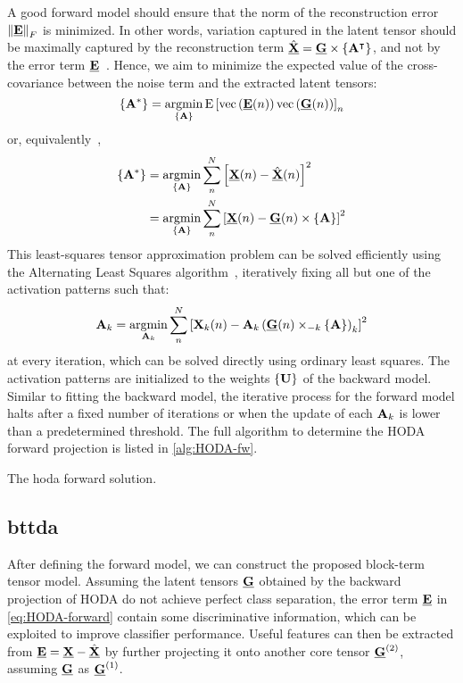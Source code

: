 \documentclass[twocolumn]{article}
\begin{document}
A good forward model should ensure that the norm of the reconstruction error
$\left\|\ten{E}\right\|_F$ is minimized.
In other words, variation captured in the latent tensor should be maximally captured by the
reconstruction term $\hat{\ten{X}}= \ten{G}\mmpr{\mat{A}^\intercal}$, and not by the error term
$\ten{E}$~\cite{Haufe2014}.
Hence, we aim to minimize the expected value of the cross-covariance between
the noise term and the extracted latent tensors:
\begin{equation}
	\left\{\mat{A}^*\right\}
	= \argmin_{\{\mat{A}\}}\text{E}\left[
		\text{vec}\left(\ten{E}(n)\right)\text{vec}\left(\ten{G}(n)\right)
		\right]_n
\end{equation}
or, equivalently~\cite{Parra2005,Haufe2014},
\begin{align}
	\left\{\mat{A}^*\right\}
	 & = \argmin_{\{\mat{A}\}}\sum_n^N\left[\ten{X}(n) -
	\hat{\ten{X}}(n)\right]^2                                                              \\
	 & = \argmin_{\{\mat{A}\}}\sum_n^N\left[\ten{X}(n) - \ten{G}(n)\mmpr{\mat{A}}\right]^2
\end{align}
This least-squares tensor approximation problem can be solved efficiently using the
Alternating Least Squares algorithm~\cite{Bentbib2022}, iteratively fixing all but one of the activation patterns such that:
\begin{equation}
	\mat{A}_k = \argmin_{\mat{A}_k}
	\sum_n^N\left[\mat{X}_k(n) -
		\mat{A}_k\left(\ten{G}(n)\mmprs{\mat{A}}{k}\right)_k\right]^2
\end{equation}
at every iteration, which can be solved directly using ordinary least squares.
The activation patterns are initialized to the weights $\{\mat{U}\}$ of the
backward model.
Similar to fitting the backward model, the iterative process for the forward
model halts after a fixed number of iterations or when the update of each
$\mat{A}_k$ is lower than a predetermined threshold.
The full algorithm to determine the HODA forward projection is listed
in \cref{alg:HODA-fw}.
\begin{algorithm}
	\caption[A \acs{hoda} forward solution.]{The \acs{hoda} forward solution.}
	\label{alg:HODA-fw}
	
\end{algorithm}

\subsection{\Acl{bttda}}
After defining the forward model, we can construct the proposed block-term
tensor model.
Assuming the latent tensors $\ten{G}$ obtained by the backward projection of
HODA do not achieve perfect
class separation, the error term $\ten{E}$ in \cref{eq:HODA-forward} contain
some discriminative information, which can be exploited to improve classifier
performance.
Useful features can then be extracted from $\ten{E} = \ten{X} -
	\hat{\ten{X}}$ by further projecting it onto another core tensor
$\ten{G}^{(2)}$, assuming $\ten{G}$ as $\ten{G}^{(1)}$.
\end{document}
